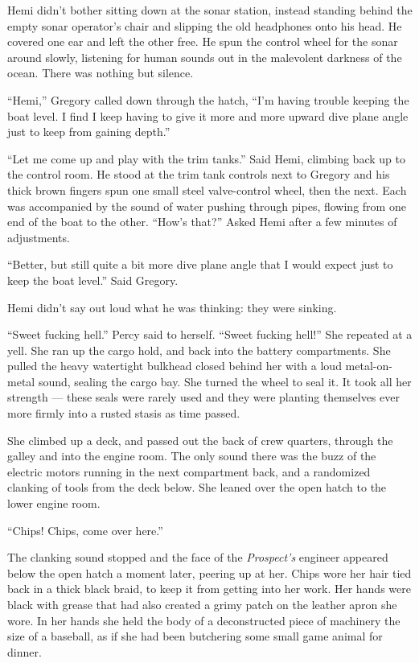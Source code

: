 \documentclass[]{scrbook}
\begin{document}
Hemi didn't bother sitting down at the sonar station, instead standing
behind the empty sonar operator's chair and slipping the old headphones
onto his head. He covered one ear and left the other free. He spun the
control wheel for the sonar around slowly, listening for human sounds
out in the malevolent darkness of the ocean. There was nothing but
silence.

``Hemi,'' Gregory called down through the hatch, ``I'm having trouble
keeping the boat level. I find I keep having to give it more and more
upward dive plane angle just to keep from gaining depth.''

``Let me come up and play with the trim tanks.'' Said Hemi, climbing
back up to the control room. He stood at the trim tank controls next to
Gregory and his thick brown fingers spun one small steel valve-control
wheel, then the next. Each was accompanied by the sound of water pushing
through pipes, flowing from one end of the boat to the other. ``How's
that?'' Asked Hemi after a few minutes of adjustments.

``Better, but still quite a bit more dive plane angle that I would
expect just to keep the boat level.'' Said Gregory.

Hemi didn't say out loud what he was thinking: they were sinking.

``Sweet fucking hell.'' Percy said to herself. ``Sweet fucking hell!''
She repeated at a yell. She ran up the cargo hold, and back into the
battery compartments. She pulled the heavy watertight bulkhead closed
behind her with a loud metal-on-metal sound, sealing the cargo bay. She
turned the wheel to seal it. It took all her strength --- these seals
were rarely used and they were planting themselves ever more firmly into
a rusted stasis as time passed.

She climbed up a deck, and passed out the back of crew quarters, through
the galley and into the engine room. The only sound there was the buzz
of the electric motors running in the next compartment back, and a
randomized clanking of tools from the deck below. She leaned over the
open hatch to the lower engine room.

``Chips! Chips, come over here.''

The clanking sound stopped and the face of the \emph{Prospect's}
engineer appeared below the open hatch a moment later, peering up at
her. Chips wore her hair tied back in a thick black braid, to keep it
from getting into her work. Her hands were black with grease that had
also created a grimy patch on the leather apron she wore. In her hands
she held the body of a deconstructed piece of machinery the size of a
baseball, as if she had been butchering some small game animal for
dinner.
\end{document}
